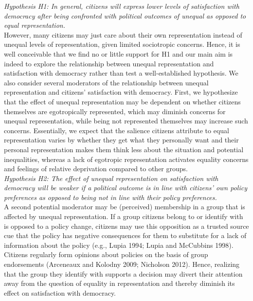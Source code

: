 \documentclass[12pt, letterpaper]{article}
\begin{document}
\begin{spacing}{1.5}
\smallskip  \textit{Hypothesis H1: In general, citizens will express lower levels of satisfaction with democracy after being confronted with political outcomes of unequal as opposed to equal representation.}  \\

However, many citizens may just care about their own representation instead of unequal levels of representation, given limited sociotropic concerns. Hence, it is well conceivable that we find no or little support for H1 and our main aim is indeed to explore the relationship between unequal representation and satisfaction with democracy rather than test a well-established hypothesis.
We also consider several moderators of the relationship between unequal representation and citizens' satisfaction with democracy. First, we hypothesize that the effect of unequal representation may be dependent on whether citizens themselves are egotropically represented, which may diminish concerns for unequal representation, while being not represented themselves may increase such concerns. Essentially, we expect that the salience citizens attribute to equal representation varies by whether they get what they personally want and their personal representation makes them think less about the situation and potential inequalities, whereas a lack of egotropic representation activates equality concerns and feelings of relative deprivation compared to other groups.\\

\smallskip  \textit{Hypothesis H2: The effect of unequal representation on satisfaction with democracy will be weaker if a political outcome is in line with citizens' own policy preferences as opposed to being not in line with their policy preferences.}\\

A second potential moderator may be (perceived) membership in a group that is affected by unequal representation. If a group citizens belong to or identify with is opposed to a policy change, citizens may use this opposition as a trusted source cue that the policy has negative consequences for them to substitute for a lack of information about the policy (e.g., Lupia 1994; Lupia and McCubbins 1998). Citizens regularly form opinions about policies on the basis of group endorsements (Arceneaux and Kolodny 2009; Nicholson 2012). Hence, realizing that the group they identify with supports a decision may divert their attention away from the question of equality in representation and thereby diminish its effect on satisfaction with democracy.\\


\end{spacing}
\end{document}
